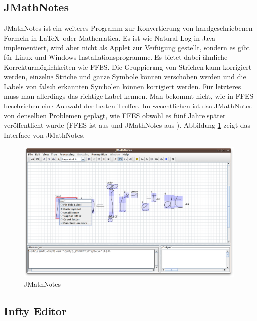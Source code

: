 \subsection{JMathNotes}

JMathNotes ist ein weiteres Programm zur Konvertierung von handgeschriebenen Formeln in \LaTeX~oder Mathematica.  Es ist wie Natural Log in Java implementiert, wird aber nicht als Applet zur Verfügung gestellt, sondern es gibt für Linux und Windows Installationsprogramme. Es bietet dabei ähnliche Korrekturmöglichkeiten wie FFES. Die Gruppierung von Strichen kann korrigiert werden, einzelne Striche und ganze Symbole können verschoben werden und die Labels von falsch erkannten Symbolen können korrigiert werden. Für letzteres muss man allerdings das richtige Label kennen. Man bekommt nicht, wie in FFES beschrieben eine Auswahl der besten Treffer.
Im wesentlichen ist das JMathNotes von denselben Problemen geplagt, wie FFES obwohl es fünf Jahre später veröffentlicht wurde (FFES ist aus \citeyear{Matasakis:1999p9465} und JMathNotes aus \citeyear{jmathnotes}). Abbildung \ref{fig:jmathnotes} zeigt das Interface von JMathNotes.

\begin{figure}[htbp]
  \begin{center}
    \includegraphics[width=\textwidth]{figures/jmathnotes.png}
  \end{center}
  \caption{JMathNotes}
  \label{fig:jmathnotes}
\end{figure}

\subsection{Infty Editor}

